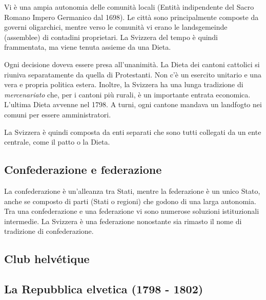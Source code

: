 \documentclass[a4paper]{article}
\begin{document}
Vi è una ampia autonomia delle comunità locali (Entità indipendente del Sacro Romano Impero Germanico dal 1698).
Le città sono principalmente composte da governi oligarchici, mentre verso le comunità
vi erano le landsgemeinde (assemblee) di contadini proprietari.
La Svizzera del tempo è quindi frammentata, ma viene tenuta assieme da una Dieta.

Ogni decisione doveva essere presa all'unanimità.
La Dieta dei cantoni cattolici si riuniva separatamente da quella di Protestanti.
Non c'è un esercito unitario e una vera e propria politica estera.
Inoltre, la Svizzera ha una lunga tradizione di \textit{mercenariato} che, per i cantoni più rurali,
è un importante entrata economica.
L'ultima Dieta avvenne nel 1798.
A turni, ogni cantone mandava un landfogto nei comuni per essere amministratori.

La Svizzera è quindi composta da enti separati che sono tutti collegati da un ente centrale, come il patto o la Dieta.

\subsection{Confederazione e federazione}

La confederazione è un'alleanza tra Stati, mentre la federazione è un unico Stato,
anche se composto di parti (Stati o regioni) che godono di una larga autonomia.
Tra una confederazione e una federazione vi sono numerose soluzioni istituzionali intermedie.
La Svizzera è una federazione nonostante sia rimasto il nome di tradizione di confederazione.

\subsection{Club helvétique}


\subsection{La Repubblica elvetica (1798 - 1802)}
\end{document}
